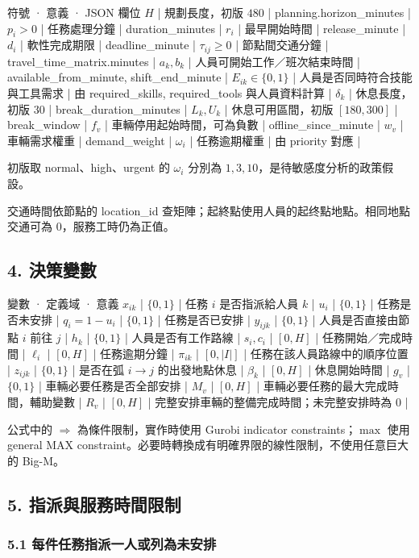 \documentclass[UTF8,fontset=fandol]{ctexart}
\begin{document}
 符號  ·  意義  ·  JSON 欄位 
 $H$ | 規劃長度，初版 $480$ | planning.horizon\_minutes |
 $p_i>0$ | 任務處理分鐘 | duration\_minutes |
 $r_i$ | 最早開始時間 | release\_minute |
 $d_i$ | 軟性完成期限 | deadline\_minute |
 $\tau_{ij}\ge0$ | 節點間交通分鐘 | travel\_time\_matrix.minutes |
 $a_k,b_k$ | 人員可開始工作／班次結束時間 | available\_from\_minute, shift\_end\_minute |
 $E_{ik}\in\{0,1\}$ | 人員是否同時符合技能與工具需求 | 由 required\_skills, required\_tools 與人員資料計算 |
 $\delta_k$ | 休息長度，初版 $30$ | break\_duration\_minutes |
 $L_k,U_k$ | 休息可用區間，初版 $[180,300]$ | break\_window |
 $f_v$ | 車輛停用起始時間，可為負數 | offline\_since\_minute |
 $w_v$ | 車輛需求權重 | demand\_weight |
 $\omega_i$ | 任務逾期權重 | 由 priority 對應 |

初版取 normal、high、urgent 的 $\omega_i$ 分別為 $1,3,10$，是待敏感度分析的政策假設。

交通時間依節點的 location\_id 查矩陣；起終點使用人員的起终點地點。相同地點交通可為 $0$，服務工時仍為正值。

\subsection*{4. 決策變數}

 變數  ·  定義域  ·  意義 
 $x_{ik}$ | $\{0,1\}$ | 任務 $i$ 是否指派給人員 $k$ |
 $u_i$ | $\{0,1\}$ | 任務是否未安排 |
 $q_i=1-u_i$ | $\{0,1\}$ | 任務是否已安排 |
 $y_{ijk}$ | $\{0,1\}$ | 人員是否直接由節點 $i$ 前往 $j$ |
 $h_k$ | $\{0,1\}$ | 人員是否有工作路線 |
 $s_i,c_i$ | $[0,H]$ | 任務開始／完成時間 |
 $\ell_i$ | $[0,H]$ | 任務逾期分鐘 |
 $\pi_{ik}$ | $[0,|I|]$ | 任務在該人員路線中的順序位置 |
 $z_{ijk}$ | $\{0,1\}$ | 是否在弧 $i\to j$ 的出發地點休息 |
 $\beta_k$ | $[0,H]$ | 休息開始時間 |
 $g_v$ | $\{0,1\}$ | 車輛必要任務是否全部安排 |
 $M_v$ | $[0,H]$ | 車輛必要任務的最大完成時間，輔助變數 |
 $R_v$ | $[0,H]$ | 完整安排車輛的整備完成時間；未完整安排時為 $0$ |

公式中的 $\Rightarrow$ 為條件限制，實作時使用 Gurobi indicator constraints；$\max$ 使用 general MAX constraint。必要時轉換成有明確界限的線性限制，不使用任意巨大的 Big-M。

\subsection*{5. 指派與服務時間限制}

\subsubsection*{5.1 每件任務指派一人或列為未安排}
\end{document}
